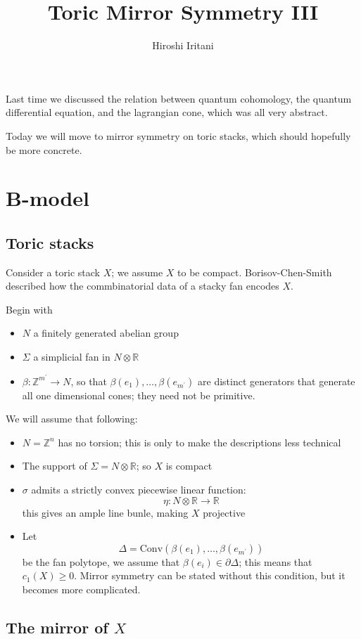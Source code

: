 \documentclass{amsart}
\author{Hiroshi Iritani}
\title{Toric Mirror Symmetry III}
\theoremstyle{definition}
\newcommand{\Z}{\mathbb{Z}}
\newcommand{\R}{\mathbb{R}}
\begin{document}
\maketitle

Last time we discussed the relation between quantum cohomology, the quantum differential equation, and the lagrangian cone, which was all very abstract.

Today we will move to mirror symmetry on toric stacks, which should hopefully be more concrete.


\section{B-model}


\subsection{Toric stacks}
Consider a toric stack $X$; we assume $X$ to be compact.  Borisov-Chen-Smith described how the commbinatorial data of a stacky fan encodes $X$.  

Begin with
\begin{itemize}
\item  $N$ a finitely generated abelian group
\item $\Sigma$ a simplicial fan in $N\otimes\R$
\item $\beta:\Z^{m^\prime}\to N$, so that $\beta(e_1),\dots,\beta(e_{m^\prime})$ are distinct generators that generate all one dimensional cones; they need not be primitive.
\end{itemize}

We will assume that following:
\begin{itemize}
\item $N=\Z^n$ has no torsion; this is only to make the descriptions less technical
\item The support of $\Sigma=N\otimes\R$; so $X$ is compact
\item $\sigma$ admits a strictly convex piecewise linear function:
$$\eta:N\otimes\R\to\R$$
this gives an ample line bunle, making $X$ projective
\item Let 
$$\Delta=\text{Conv}\left(\beta(e_1),\dots,\beta(e_{m^\prime})\right)$$
 be the fan polytope, we assume that $\beta(e_i)\in\partial\Delta$; this means that $c_1(X)\geq 0$.  Mirror symmetry can be stated without this condition, but it becomes more complicated.
\end{itemize}
\subsection{The mirror of $X$}
\end{document}
